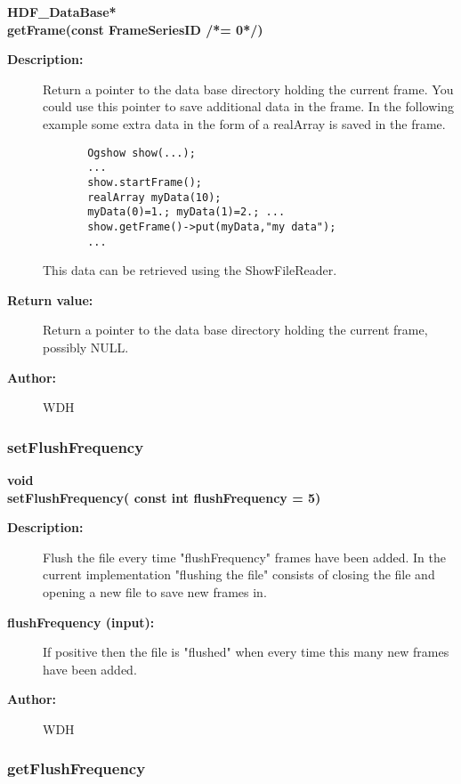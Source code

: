 \begin{flushleft} \textbf{%
HDF\_DataBase*  \\ 
\settowidth{\OgshowIncludeArgIndent}{getFrame(}%
getFrame(const  FrameSeriesID /*= 0*/)
}\end{flushleft}
\begin{description}
\item[{\bf Description:}] 
     Return a pointer to the data base directory holding the current frame.
     You could use this pointer to save additional data in the frame. In the following example
     some extra data in the form of a realArray is saved in the frame. 
    \begin{verbatim}
       Ogshow show(...);
       ...
       show.startFrame();
       realArray myData(10); 
       myData(0)=1.; myData(1)=2.; ...
       show.getFrame()->put(myData,"my data");
       ...
    \end{verbatim}
    This data can be retrieved using the ShowFileReader.
\item[{\bf Return value:}]  Return a pointer to the data base directory holding the current frame, possibly NULL.
\item[{\bf Author:}]  WDH
\end{description}
\subsubsection{setFlushFrequency}
 
\begin{flushleft} \textbf{%
void   \\ 
\settowidth{\OgshowIncludeArgIndent}{setFlushFrequency(}%
setFlushFrequency( const int flushFrequency    = 5)
}\end{flushleft}
\begin{description}
\item[{\bf Description:}] 
     Flush the file every time "flushFrequency" frames have been added.
   In the current implementation "flushing the file" consists of closing the file
   and opening a new file to save new frames in. 

\item[{\bf flushFrequency (input):}]  If positive then the file is "flushed" when every time
    this many new frames have been added.
\item[{\bf Author:}]  WDH
\end{description}
\subsubsection{getFlushFrequency}
 

